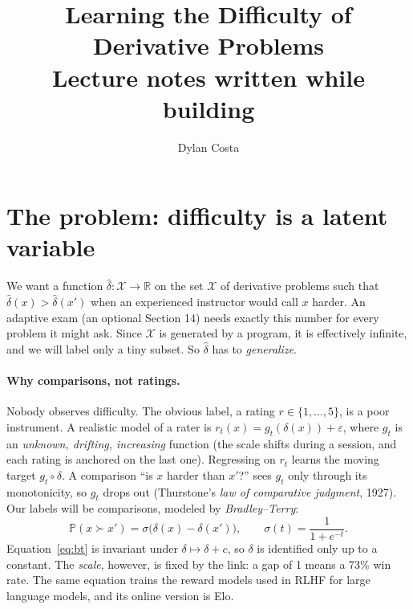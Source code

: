 \documentclass[11pt]{article}
\title{Learning the Difficulty of Derivative Problems\\[4pt]\large Lecture notes written while building \code{calc-adaptive-assessment}}
\author{Dylan Costa}
\date{}
\theoremstyle{definition}
\theoremstyle{plain}
\theoremstyle{remark}
\newcommand{\R}{\mathbb{R}}
\renewcommand{\P}{\mathbb{P}}
\newcommand{\X}{\mathcal{X}}
\renewcommand{\_}{\oldunderscore\allowbreak}
\begin{document}
\maketitle
\tableofcontents

\setcounter{section}{-1}

\section{The problem: difficulty is a latent variable}
\label{sec:problem}

We want a function $\hat\delta:\X\to\R$ on the set $\X$ of derivative problems
such that $\hat\delta(x)>\hat\delta(x')$ when an experienced instructor would call $x$ harder.
An adaptive exam (an optional Section 14) needs exactly this number for every problem it might
ask. Since $\X$ is generated by a program, it is effectively infinite, and we will label only a
tiny subset. So $\hat\delta$ has to \emph{generalize}.

\paragraph{Why comparisons, not ratings.}
Nobody observes difficulty. The obvious label, a rating $r\in\{1,\dots,5\}$, is a poor
instrument. A realistic model of a rater is $r_t(x)=g_t(\delta(x))+\varepsilon$, where $g_t$ is
an \emph{unknown, drifting, increasing} function (the scale shifts during a session, and
each rating is anchored on the last one). Regressing on $r_t$ learns the moving target
$g_t\circ\delta$. A comparison ``is $x$ harder than $x'$?'' sees $g_t$ only through its
monotonicity, so $g_t$ drops out (Thurstone's \emph{law of comparative judgment}, 1927).
Our labels will be comparisons, modeled by \emph{Bradley--Terry}:
\begin{equation}\label{eq:bt}
  \P(x\succ x') = \sigma\bigl(\delta(x)-\delta(x')\bigr),\qquad \sigma(t)=\frac{1}{1+e^{-t}}.
\end{equation}
Equation~\eqref{eq:bt} is invariant under $\delta\mapsto\delta+c$, so $\delta$ is identified only up to
a constant. The \emph{scale}, however, is fixed by the link: a gap of 1 means a 73\%
win rate. The same equation trains the reward models used in RLHF for large
language models, and its online version is Elo.
\end{document}
